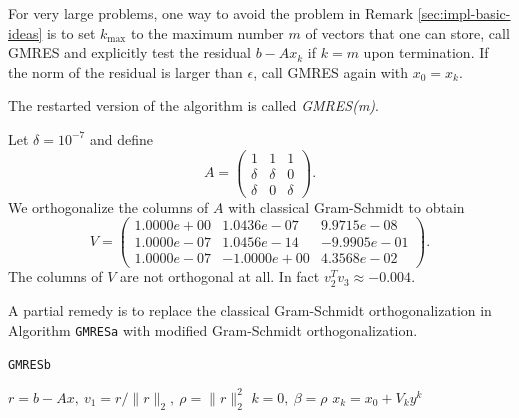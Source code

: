 \begin{defi}
  For very large problems, one way to avoid the problem in
  Remark \ref{sec:impl-basic-ideas}  is to set $k_{\text{max}}$ to the
  maximum number $m$ of vectors that one can store, call GMRES and
  explicitly test the residual $b-Ax_k$ if $k=m$ upon termination. If
  the norm of the residual is larger than $\epsilon$, call GMRES again
  with $x_0=x_k$.

  The restarted version of the algorithm is called \emph{GMRES(m)}.
\end{defi}

\begin{exm}
  Let $\delta=10^{-7}$ and define
  $$A=\left(
    \begin{array}{ccc}
      1&1&1 \\ \delta&\delta&0 \\ \delta & 0 & \delta
    \end{array}\right).
  $$
  We orthogonalize the columns of $A$ with classical Gram-Schmidt to
  obtain
  $$V=\left(
    \begin{array}{ccc}
      1.0000e+00 &1.0436e-07 & 9.9715e-08 \\
      1.0000e-07 & 1.0456e-14 & -9.9905e-01 \\
      1.0000e-07 & -1.0000e+00& 4.3568e-02
    \end{array}\right).
  $$
  The columns of $V$ are not orthogonal at all. In fact
  $v_2^Tv_3\approx -0.004.$

\end{exm}

\begin{algo}
  A partial remedy is to replace the classical Gram-Schmidt
  orthogonalization in Algorithm \texttt{GMRESa} with modified
  Gram-Schmidt orthogonalization.

  \IncMargin{1em}
  \LinesNumbered
  \begin{algorithm}[H]

    \caption{\texttt{GMRESb}}
    \BlankLine
    $r=b-Ax,\ v_1=r/\|r\|_2,\ \rho=\|r\|_2^2$\;
    $k=0,\ \beta=\rho$\;
    $x_k=x_0+V_ky^k$\;
  \end{algorithm}
  \DecMargin{1em}
\end{algo}

